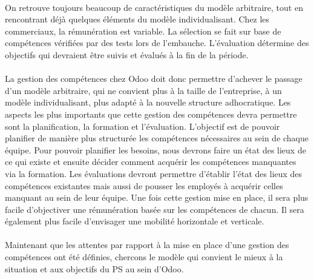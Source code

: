 \paragraph{} On retrouve toujours beaucoup de caractéristiques du modèle arbitraire, tout en rencontrant déjà quelques éléments du modèle individualisant. Chez les commerciaux, la rémunération est variable. La sélection se fait sur base de compétences vérifiées par des tests lors de l'embauche. L'évaluation détermine des objectifs qui devraient être suivis et évalués à la fin de la période.


\paragraph{} La gestion des compétences chez Odoo doit donc permettre d'achever le passage d'un modèle arbitraire, qui ne convient plus à la taille de l'entreprise, à un modèle individualisant, plus adapté à la nouvelle structure adhocratique. Les aspects les plus importants que cette gestion des compétences devra permettre sont la planification, la formation et l'évaluation. L'objectif est de pouvoir planifier de manière plus structurée les compétences nécessaires au sein de chaque équipe. Pour pouvoir planifier les besoins, nous devrons faire un état des lieux de ce qui existe et ensuite décider comment acquérir les compétences manquantes via la formation. Les évaluations devront permettre d'établir l'état des lieux des compétences existantes mais aussi de pousser les employés à acquérir celles manquant au sein de leur équipe. Une fois cette gestion mise en place, il sera plus facile d'objectiver une rémunération basée sur les compétences de chacun. Il sera également plus facile d'envisager une mobilité horizontale et verticale.

\paragraph{} Maintenant que les attentes par rapport à la mise en place d'une gestion des compétences ont été définies, chercons le modèle qui convient le mieux à la situation et aux objectifs du PS au sein d'Odoo.






